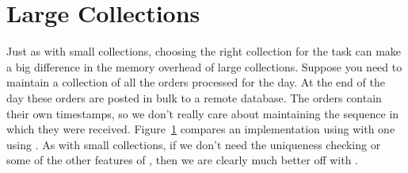





\section{Large Collections}

Just as with small collections, choosing the right collection for the task
can make a big difference in the memory overhead of large collections.  Suppose
you need to maintain a collection of all the orders processed for the day.  At
the end of the day these orders are posted in bulk to a remote database. The orders
contain their own timestamps, so we don't really care about maintaining the
sequence in which they were received. Figure~\ref{} compares an implementation
using  with one using . As with small
collections, if we don't need the uniqueness checking or some of the
other features of , then we are clearly much better off with .

